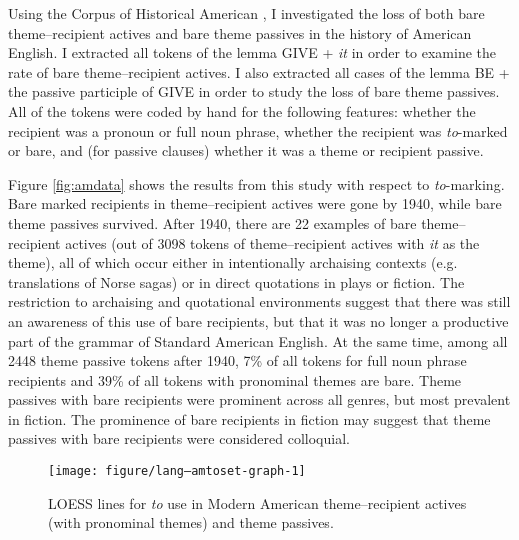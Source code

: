 Using the Corpus of Historical American \citep{Davies.2010}, I investigated the loss of both bare theme--recipient actives and bare theme passives in the history of American English. I extracted all tokens of the lemma GIVE + \textit{it} in order to examine the rate of bare theme--recipient actives. I also extracted all cases of the lemma BE + the passive participle of GIVE in order to study the loss of bare theme passives. All of the tokens were coded by hand for the following features: whether the recipient was a pronoun or full noun phrase, whether the recipient was \textit{to}-marked or bare, and (for passive clauses) whether it was a theme or recipient passive.



Figure \ref{fig:amdata} shows the results from this study with respect to \textit{to}-marking. Bare marked recipients in theme--recipient actives were gone by 1940, while bare theme passives survived. After 1940, there are 22 examples of bare theme--recipient actives (out of 3098 tokens of theme--recipient actives with \textit{it} as the theme), all of which occur either in intentionally archaising contexts (e.g. translations of Norse sagas) or in direct quotations in plays or fiction. The restriction to archaising and quotational environments suggest that there was still an awareness of this use of bare recipients, but that it was no longer a productive part of the grammar of Standard American English. At the same time, among all 2448 theme passive tokens after 1940, 7\% of all tokens for full noun phrase recipients and 39\% of all tokens with pronominal themes are bare. Theme passives with bare recipients were prominent across all genres, but most prevalent in fiction. The prominence of bare recipients in fiction may suggest that theme passives with bare recipients were considered colloquial.

\begin{knitrout}
\color{fgcolor}\begin{figure}[ht!]

{\centering \texttt{[image: figure/lang--amtoset-graph-1]} 

}

\caption{LOESS lines for \textit{to} use in Modern American theme--recipient actives (with pronominal themes) and theme passives.\label{fig:amdata}}\label{fig:amtoset-graph}
\end{figure}


\end{knitrout}


